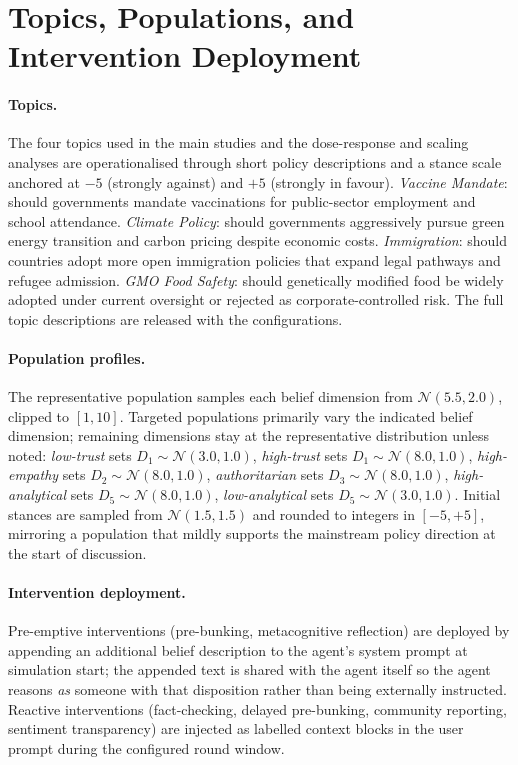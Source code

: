 \section{Topics, Populations, and Intervention Deployment}
\label{app:impl}

\paragraph{Topics.}
The four topics used in the main studies and the dose-response and scaling analyses are operationalised through short policy descriptions and a stance scale anchored at $-5$ (strongly against) and $+5$ (strongly in favour). \emph{Vaccine Mandate}: should governments mandate vaccinations for public-sector employment and school attendance. \emph{Climate Policy}: should governments aggressively pursue green energy transition and carbon pricing despite economic costs. \emph{Immigration}: should countries adopt more open immigration policies that expand legal pathways and refugee admission. \emph{GMO Food Safety}: should genetically modified food be widely adopted under current oversight or rejected as corporate-controlled risk. The full topic descriptions are released with the configurations.

\paragraph{Population profiles.}
The representative population samples each belief dimension from $\mathcal{N}(5.5, 2.0)$, clipped to $[1, 10]$. Targeted populations primarily vary the indicated belief dimension; remaining dimensions stay at the representative distribution unless noted: \emph{low-trust} sets $D_1 \sim \mathcal{N}(3.0, 1.0)$, \emph{high-trust} sets $D_1 \sim \mathcal{N}(8.0, 1.0)$, \emph{high-empathy} sets $D_2 \sim \mathcal{N}(8.0, 1.0)$, \emph{authoritarian} sets $D_3 \sim \mathcal{N}(8.0, 1.0)$, \emph{high-analytical} sets $D_5 \sim \mathcal{N}(8.0, 1.0)$, \emph{low-analytical} sets $D_5 \sim \mathcal{N}(3.0, 1.0)$. Initial stances are sampled from $\mathcal{N}(1.5, 1.5)$ and rounded to integers in $[-5, +5]$, mirroring a population that mildly supports the mainstream policy direction at the start of discussion.

\paragraph{Intervention deployment.}
Pre-emptive interventions (pre-bunking, metacognitive reflection) are deployed by appending an additional belief description to the agent's system prompt at simulation start; the appended text is shared with the agent itself so the agent reasons \emph{as} someone with that disposition rather than being externally instructed. Reactive interventions (fact-checking, delayed pre-bunking, community reporting, sentiment transparency) are injected as labelled context blocks in the user prompt during the configured round window.
